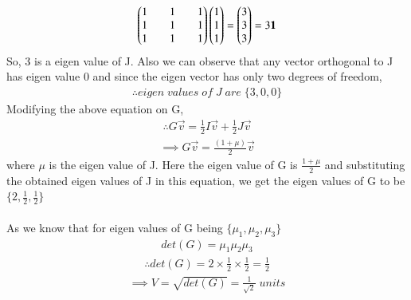 \documentclass[journal]{IEEEtran}
\begin{document}
\begin{align*}
    \begin{pmatrix}1&&1&&1\\1&&1&&1\\1&&1&&1\end{pmatrix}\begin{pmatrix}1\\1\\1\end{pmatrix}=\begin{pmatrix}3\\3\\3\end{pmatrix}=3\mathbf{1}
\end{align*}
So, 3 is a eigen value of J. Also we can observe that any vector orthogonal to J has eigen value 0 and since the eigen vector has only two degrees of freedom,
\begin{align*}
    \therefore eigen\;values\;of\;J\;are\;\{3,0,0\}
\end{align*}
Modifying the above equation on G,
\begin{align*}
    \therefore G\vec{v}=\frac{1}{2}I\vec{v}+\frac{1}{2}J\vec{v}
\end{align*}
\begin{align*}
    \implies G\vec{v}=\frac{(1+\mu)}{2}\vec{v}
\end{align*}
where $\mu$ is the eigen value of J. Here the eigen value of G is $\frac{1+\mu}{2}$ and substituting the obtained eigen values of J in this equation, we get the eigen values of G to be $\{2,\frac{1}{2},\frac{1}{2}\}$\\
\\
As we know that for eigen values of G being $\{\mu_1,\mu_2,\mu_3\}$
\begin{align*}
    det(G)=\mu_1\mu_2\mu_3
\end{align*}
\begin{align*}
    \therefore det(G)=2\times\frac{1}{2}\times\frac{1}{2}=\frac{1}{2}
\end{align*}
\begin{align*}
    \implies V=\sqrt{det(G)}=\frac{1}{\sqrt{2}} \; units
\end{align*}
\end{document}

